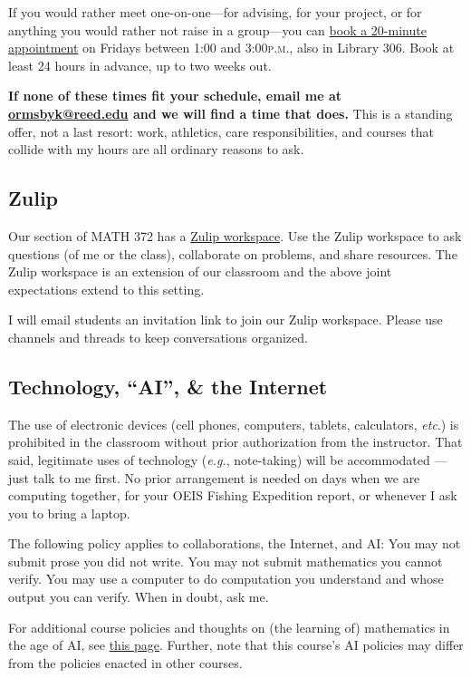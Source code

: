 \documentclass[11pt,twoside]{amsart}
\begin{document}
If you would rather meet one-on-one---for advising, for your project, or for anything you would rather not raise in a group---you can \href{https://calendar.app.google/xUQmAFHKmqt44Q7R8}{book a 20-minute appointment} on Fridays between 1:00 and 3:00\textsc{p.m.}, also in Library 306.  Book at least 24 hours in advance, up to two weeks out.

\textbf{If none of these times fit your schedule, email me at \href{mailto:ormsbyk@reed.edu}{ormsbyk@reed.edu} and we will find a time that does.}  This is a standing offer, not a last resort: work, athletics, care responsibilities, and courses that collide with my hours are all ordinary reasons to ask.

\subsection*{Zulip}
Our section of MATH 372 has a \href{https://math372fall26.zulipchat.com/}{Zulip workspace}.  Use the Zulip workspace to ask questions (of me or the class), collaborate on problems, and share resources. The Zulip workspace is an extension of our classroom and the above joint expectations extend to this setting.

I will email students an invitation link to join our Zulip workspace. Please use channels and threads to keep conversations organized.

\subsection*{Technology, ``AI'', \& the Internet}
The use of electronic devices (cell phones, computers, tablets, 
calculators, \emph{etc}.) is prohibited in the classroom without prior authorization from the instructor.  That said, legitimate uses 
of technology (\emph{e.g.}, note-taking) will be accommodated --- 
just talk to me first.  No prior arrangement is needed on days when we are computing together, for your OEIS Fishing Expedition report, or whenever I ask you to bring a laptop.

The following policy applies to collaborations, the Internet, and AI: You may not submit prose you did not write. You may not submit mathematics you cannot verify. You may use a computer to do computation you understand and whose output you can verify. When in doubt, ask me.

For additional course policies and thoughts on (the learning of) mathematics in the age of AI, see \href{https://e-infinity.space/372ai/}{this page}. Further, note that this course's AI policies may differ from the policies enacted in other courses.
\end{document}
